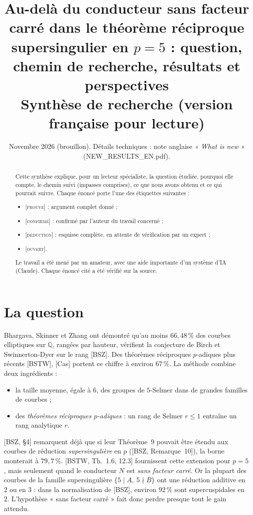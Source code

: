 \documentclass[11pt]{amsart}
\title[Synthèse de recherche]{Au-delà du conducteur sans facteur carré dans le théorème réciproque supersingulier en $p=5$ : question, chemin de recherche, résultats et perspectives\\[4pt]\normalfont\small Synthèse de recherche (version française pour lecture)}
\date{Novembre 2026 (brouillon). Détails techniques : note anglaise \emph{« What is new »} (NEW\_RESULTS\_EN.pdf).}
\newcommand{\Q}{\mathbb{Q}}
\newcommand{\stat}[1]{\textsc{[#1]}}
\begin{document}
\begin{abstract}
Cette synthèse explique, pour un lecteur spécialiste, la question étudiée, pourquoi elle compte, le chemin suivi (impasses comprises), ce que nous avons obtenu et ce qui pourrait suivre. Chaque énoncé porte l'une des étiquettes suivantes :
\begin{itemize}
\item \stat{prouvé} : argument complet donné ;
\item \stat{confirmé} : confirmé par l'auteur du travail concerné ;
\item \stat{déduction} : esquisse complète, en attente de vérification par un expert ;
\item \stat{ouvert}.
\end{itemize}
Le travail a été mené par un amateur, avec une aide importante d'un système d'IA (Claude). Chaque énoncé cité a été vérifié sur la source.
\end{abstract}
\maketitle

\section{La question}
Bhargava, Skinner et Zhang ont démontré qu'au moins $66{,}48\,\%$ des courbes elliptiques sur $\Q$, rangées par hauteur, vérifient la conjecture de Birch et Swinnerton-Dyer sur le rang [BSZ]. Des théorèmes réciproques $p$-adiques plus récents [BSTW], [Cas] portent ce chiffre à environ $67\,\%$. La méthode combine deux ingrédients :
\begin{itemize}
\item la taille moyenne, égale à $6$, des groupes de $5$-Selmer dans de grandes familles de courbes ;
\item des \emph{théorèmes réciproques $p$-adiques} : un rang de Selmer $r\le1$ entraîne un rang analytique $r$.
\end{itemize}

[BSZ, \S4] remarquent déjà que si leur Théorème~9 pouvait être étendu aux courbes de réduction \emph{supersingulière} en $p$ ([BSZ, Remarque~10]), la borne monterait à $79{,}7\,\%$. [BSTW, Th.~1.6, 12.3] fournissent cette extension pour $p=5$, mais seulement quand le conducteur $N$ est \emph{sans facteur carré}. Or la plupart des courbes de la famille supersingulière $\{5\mid A,\ 5\nmid B\}$ ont une réduction additive en $2$ ou en $3$ : dans la normalisation de [BSZ], environ $92\,\%$ sont supercuspidales en $2$. L'hypothèse « sans facteur carré » fait donc perdre presque tout le gain attendu.
\end{document}
